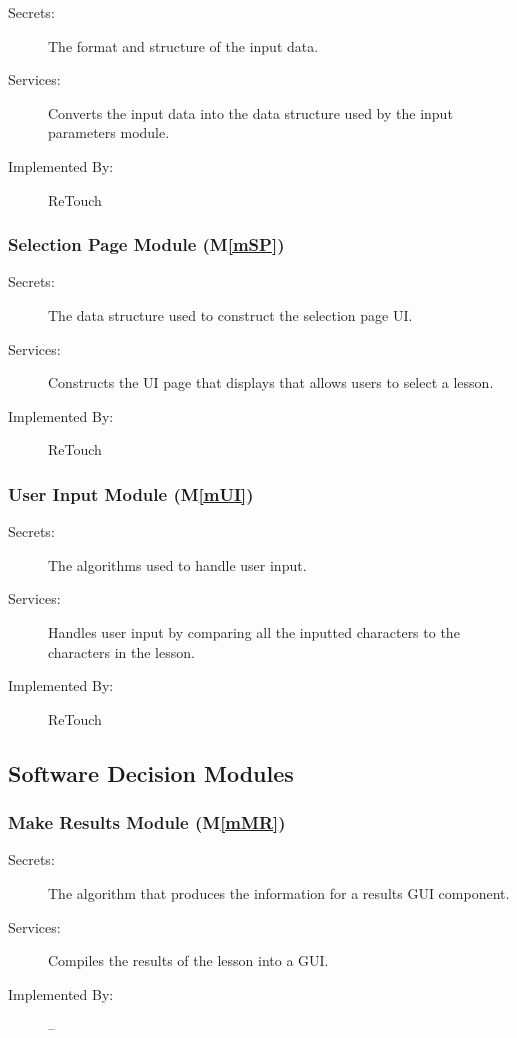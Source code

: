 \documentclass[12pt, titlepage]{article}
\newcommand{\mref}[1]{M\ref{#1}}
\begin{document}
\begin{description}
\item[Secrets:]The format and structure of the input data.
\item[Services:]Converts the input data into the data structure used by the
  input parameters module.
\item[Implemented By:] ReTouch
\end{description}


\subsubsection{Selection Page Module (\mref{mSP})}

\begin{description}
\item[Secrets:]The data structure used to construct the selection page UI.
\item[Services:]Constructs the UI page that displays that allows users to select a lesson.
\item[Implemented By:] ReTouch
\end{description}


\subsubsection{User Input Module (\mref{mUI})}

\begin{description}
\item[Secrets:]The algorithms used to handle user input.
\item[Services:]Handles user input by comparing all the inputted characters to the characters in the lesson.
\item[Implemented By:] ReTouch
\end{description}


\subsection{Software Decision Modules}


\subsubsection{Make Results Module (\mref{mMR})}

\begin{description}
\item[Secrets:] The algorithm that produces the information for a results GUI component.
\item[Services:] Compiles the results of the lesson into a GUI.
\item[Implemented By:] --
\end{description}
\end{document}
